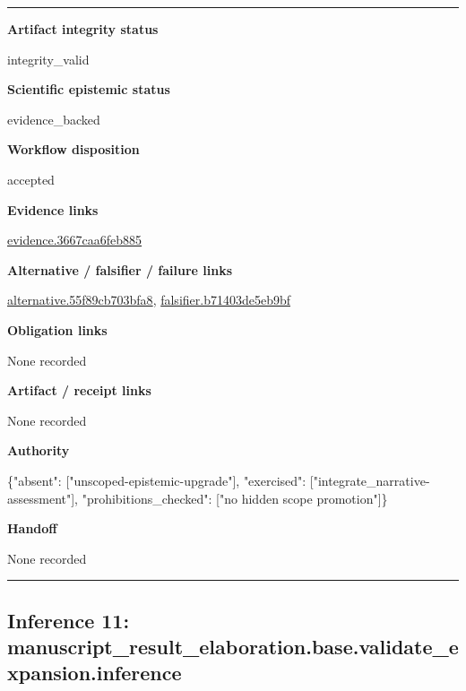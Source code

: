 \documentclass[10pt,a4paper]{article}
\newcommand{\TraceField}[2]{\par\noindent\textbf{#1}\par\noindent #2\par\smallskip}
\newenvironment{TraceDossier}{\par\medskip\noindent\hrule\medskip}{\medskip\hrule\par\medskip}
\begin{document}
\begin{TraceDossier}
\TraceField{Artifact integrity status}{integrity\_\allowbreak{}valid}

\TraceField{Scientific epistemic status}{evidence\_\allowbreak{}backed}

\TraceField{Workflow disposition}{accepted}

\TraceField{Evidence links}{\hyperlink{trace-evidence-c380a0b97e62aebd78}{evidence.\allowbreak{}3667caa6fe\allowbreak{}b885}}

\TraceField{Alternative / falsifier / failure links}{\hyperlink{trace-alternative-878e6a7ec5021dcfc4}{alternativ\allowbreak{}e.\allowbreak{}55f89cb703\allowbreak{}bfa8}, \hyperlink{trace-alternative-e9d26b458c60e3c7d2}{falsifier.\allowbreak{}b71403de5e\allowbreak{}b9bf}}

\TraceField{Obligation links}{None recorded}

\TraceField{Artifact / receipt links}{None recorded}

\TraceField{Authority}{\{"absent":\allowbreak{} ["unscoped\allowbreak{}-\allowbreak{}epistemic-\allowbreak{}upgrade"],\allowbreak{} "exercised\allowbreak{}":\allowbreak{} ["integrat\allowbreak{}e\_\allowbreak{}narrative-\allowbreak{}assessment\allowbreak{}"], "prohibiti\allowbreak{}ons\_\allowbreak{}checked":\allowbreak{} ["no hidden scope promotion"\allowbreak{}]\}}

\TraceField{Handoff}{None recorded}

\end{TraceDossier}
\pagebreak[2]\subsection{Inference 11: manuscript\allowbreak{}\_\allowbreak{}result\_\allowbreak{}elaboratio\allowbreak{}n.\allowbreak{}base.\allowbreak{}validate\_\allowbreak{}expansion.\allowbreak{}inference}\label{trace-inference-13b648978fc296ada7}
\end{document}
